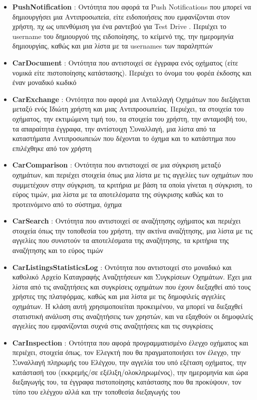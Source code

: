 \documentclass{../ol-softwaremanual}
\begin{document}
\begin{itemize}
		\item \en \textbf{PushNotification} \gr : Οντότητα που αφορά τα \en Push Notifications \gr που μπορεί να δημιουργήσει μια Αντιπροσωπεία, είτε ειδοποιήσεις που εμφανίζονται στον χρήστη, πχ ως υπενθύμιση για ένα ραντεβού για \en Test Drive \gr. Περιέχει το \en username \gr του δημιουργού της ειδοποίησης, το κείμενό της, την ημερομηνία δημιουργίας, καθώς και μια λίστα με τα \en usernames \gr των παραληπτών
		\item \en \textbf{CarDocument} \gr : Οντότητα που αντιστοιχεί σε έγγραφα ενός οχήματος (είτε νομικά είτε πιστοποίησης κατάστασης). Περιέχει το όνομα του φορέα έκδοσης και έναν μοναδικό κωδικό
		\item \en \textbf{CarExchange} \gr : Οντότητα που αφορά μια Ανταλλαγή Οχημάτων που διεξάγεται μεταξύ ενός Ιδιώτη χρήστη και μιας Αντιπροσωπείας. Περιέχει, τα στοιχεία του οχήματος, την εκτιμώμενη τιμή του,  τα στοιχεία του χρήστη, την ανταμοιβή του, τα απαραίτητα έγγραφα, την αντίστοιχη Συναλλαγή, μια λίστα από τα καταστήματα Αντιπροσωπειών που δέχονται το όχημα και το κατάστημα που επιλέχθηκε από τον χρήστη
		\item \en \textbf{CarComparison} \gr : Οντότητα που αντιστοιχεί σε μια σύγκριση μεταξύ οχημάτων, και περιέχει στοιχεία όπως μια λίστα με τις αγγελίες των οχημάτων που συμμετέχουν στην σύγκριση, τα κριτήρια με βάση τα οποία γίνεται η σύγκριση, το εύρος τιμών, μια λίστα με τα αποτελέσματα της σύγκρισης καθώς και το προτεινόμενο από το σύστημα, όχημα
		\item \en \textbf{CarSearch} \gr : Οντότητα που αντιστοιχεί σε αναζήτησης οχήματος και περιέχει στοιχεία όπως την τοποθεσία του χρήστη, την ακτίνα αναζήτησης, μια λίστα με τις αγγελίες που συνιστούν τα αποτελέσματα της αναζήτησης, τα κριτήρια της αναζήτησης και το εύρος τιμών		
		\item \en \textbf{CarListingsStatisticsLog} \gr : Οντότητα που αντιστοιχεί στο μοναδικό και καθολικό Αρχείο Καταγραφής Αναζητήσεων και Συγκρίσεων Οχημάτων. Έχει μια λίστα από τις αναζητήσεις και συγκρίσεις οχημάτων που έχουν διεξαχθεί από τους χρήστες της πλατφόρμας, καθώς και μια λίστα με τις δημοφιλείς αγγελίες οχημάτων. Η κλάση αυτή χρησιμοποιείται προκειμένου, να μπορεί να διεξαχθεί στατιστική ανάλυση στις αναζητήσεις των χρηστών, και να εξαχθούν οι δημοφιλείς αγγελίες που εμφανίζονται συχνά στις αναζητήσεις και τις συγκρίσεις		
		\item \en \textbf{CarInspection} \gr : Οντότητα που αφορά προγραμματισμένο έλεγχο οχήματος και περιέχει, στοιχεία όπως, τον Ελεγκτή που θα πραγματοποιήσει τον έλεγχο, την Συναλλαγή πληρωμής του Ελέγχου, την αγγελία του υπό εξέταση οχήματος, την κατάστασή του (εκκρεμής/σε εξέλιξη/ολοκληρωμένος), την ημερομηνία και ώρα διεξαγωγής του, τα έγγραφα πιστοποίησης κατάστασης που θα προκύψουν, τον τύπο του ελέγχου αλλά και την τοποθεσία διεξαγωγής του

\end{itemize}
\end{document}
